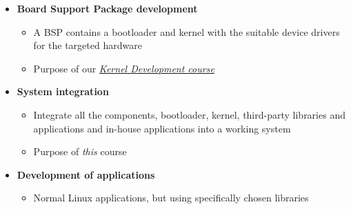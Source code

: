   \begin{itemize}
  \item {\bf Board Support Package development}
    \begin{itemize}
    \item A BSP contains a bootloader and kernel with the suitable
      device drivers for the targeted hardware
    \item Purpose of our \href{https://bootlin.com/training/kernel}
      {\em Kernel Development course}
    \end{itemize}
  \item {\bf System integration}
    \begin{itemize}
    \item Integrate all the components, bootloader, kernel,
      third-party libraries and applications and in-house applications
      into a working system
    \item Purpose of {\em this} course
    \end{itemize}
  \item {\bf Development of applications}
    \begin{itemize}
    \item Normal Linux applications, but using specifically chosen
      libraries
    \end{itemize}
  \end{itemize}

